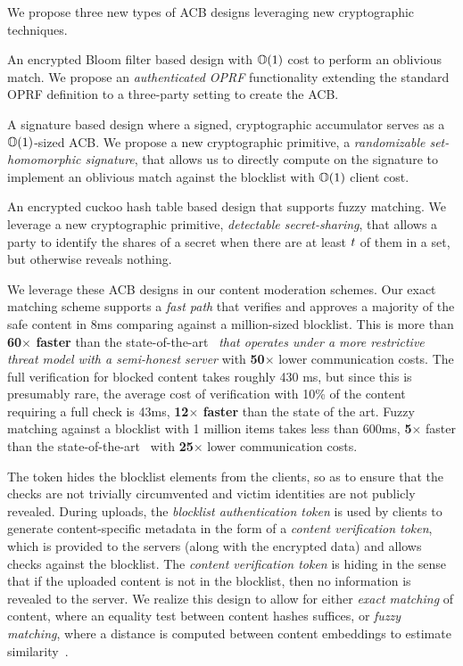 %
We propose three new types of ACB designs leveraging new cryptographic techniques.

\itemListStart
\item An encrypted Bloom filter based design with $\mathbb{O}(1)$ cost to perform an oblivious match. We propose an \emph{authenticated OPRF} functionality extending the standard OPRF definition to a  three-party setting to create the ACB. 
\item A signature based design where a signed, cryptographic accumulator serves as a $\mathbb{O}(1)$-sized ACB. We propose a new cryptographic primitive, a \emph{randomizable set-homomorphic signature}, that allows us to directly compute on the signature to implement an oblivious match against the blocklist with $\mathbb{O}(1)$ client cost. 
\item An encrypted cuckoo hash table based design that supports fuzzy matching. We leverage a new cryptographic primitive, \emph{detectable secret-sharing}, that allows a party to identify the shares of a secret when there are at least $t$ of them in a set, but otherwise reveals nothing.  
\itemListEnd

%
We leverage these ACB designs in our content moderation schemes. Our exact matching scheme supports a \emph{fast path} that verifies and approves a majority of the safe content in  
8ms comparing against a million-sized blocklist. This is more than \textbf{60$\times$ faster} than the state-of-the-art~\cite{kulshrestha2021identifying} \emph{that operates under a more restrictive threat model with a semi-honest server} with \textbf{50$\times$} lower communication costs. The full verification for blocked content takes roughly 430 ms, but since this is presumably rare, the average cost of verification with 10\% of the content requiring a full check is 43ms, \textbf{12$\times$ faster} than the state of the art. Fuzzy matching against a blocklist with 1 million items takes less than 600ms,  \textbf{5$\times$} faster than the state-of-the-art~\cite{kulshrestha2021identifying} with \textbf{25$\times$} lower communication costs. 



\iffalse 
The token hides the blocklist elements from the clients, so 
as to ensure that the checks are not trivially circumvented and victim identities are not 
publicly revealed. During uploads, the \emph{blocklist authentication token} is
used by clients to generate content-specific metadata
in the form of a \emph{content verification token}, which is provided to the servers (along with the encrypted data)
and allows checks against the blocklist. The
\emph{content verification token} is hiding in the sense that if the uploaded content is
not in the blocklist, then no information is revealed to the server.
We realize this design to allow for either \emph{exact matching} of content, where an equality test between
content hashes suffices, or \emph{fuzzy matching}, where a
distance is computed between content embeddings to estimate
similarity~\cite{yang2025certphash}.



